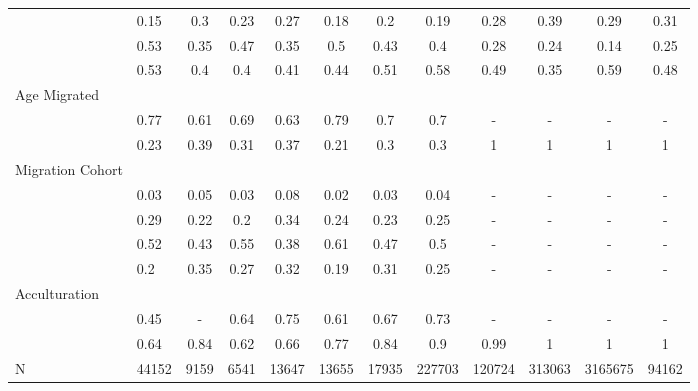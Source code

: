 \begin{table}[ht]
\begin{tabular}{>{\raggedright\arraybackslash}p{3.2cm}|lcccccc|cccc}
  \multicolumn{1}{>{\raggedleft\arraybackslash}p{2.2cm}|}{\makebox[2.2cm][r]{Lives Alone }}& 0.15 & 0.3 & 0.23 & 0.27 & 0.18 & 0.2 & 0.19 & 0.28 & 0.39 & 0.29 & 0.31 \\ 
  \multicolumn{1}{>{\raggedleft\arraybackslash}p{2.9cm}|}{\makebox[2.9cm][r]{Lives with Child }}& 0.53 & 0.35 & 0.47 & 0.35 & 0.5 & 0.43 & 0.4 & 0.28 & 0.24 & 0.14 & 0.25 \\ 
  \multicolumn{1}{>{\raggedleft\arraybackslash}p{3.4cm}|}{\makebox[3.4cm][r]{Married/Cohabiting }}& 0.53 & 0.4 & 0.4 & 0.41 & 0.44 & 0.51 & 0.58 & 0.49 & 0.35 & 0.59 & 0.48 \\ 
  Age Migrated &  &  &  &  &  &  &  &  &  &  &  \\ 
  \multicolumn{1}{>{\raggedleft\arraybackslash}p{1.6cm}|}{\makebox[1.6cm][r]{24 - 49 }}& 0.77 & 0.61 & 0.69 & 0.63 & 0.79 & 0.7 & 0.7 & - & - & - & - \\ 
  \multicolumn{1}{>{\raggedleft\arraybackslash}p{2.6cm}|}{\makebox[2.6cm][r]{50 and Above }}& 0.23 & 0.39 & 0.31 & 0.37 & 0.21 & 0.3 & 0.3 & 1 & 1 & 1 & 1 \\ 
  Migration Cohort &  &  &  &  &  &  &  &  &  &  &  \\ 
  \multicolumn{1}{>{\raggedleft\arraybackslash}p{2.3cm}|}{\makebox[2.3cm][r]{Before 1965 }}& 0.03 & 0.05 & 0.03 & 0.08 & 0.02 & 0.03 & 0.04 & - & - & - & - \\ 
  \multicolumn{1}{>{\raggedleft\arraybackslash}p{2.2cm}|}{\makebox[2.2cm][r]{1965 - 1979 }}& 0.29 & 0.22 & 0.2 & 0.34 & 0.24 & 0.23 & 0.25 & - & - & - & - \\ 
  \multicolumn{1}{>{\raggedleft\arraybackslash}p{2.2cm}|}{\makebox[2.2cm][r]{1980 - 1999 }}& 0.52 & 0.43 & 0.55 & 0.38 & 0.61 & 0.47 & 0.5 & - & - & - & - \\ 
  \multicolumn{1}{>{\raggedleft\arraybackslash}p{2.1cm}|}{\makebox[2.1cm][r]{After 1999 }}& 0.2 & 0.35 & 0.27 & 0.32 & 0.19 & 0.31 & 0.25 & - & - & - & - \\ 
  Acculturation &  &  &  &  &  &  &  &  &  &  &  \\ 
  \multicolumn{1}{>{\raggedleft\arraybackslash}p{1.6cm}|}{\makebox[1.6cm][r]{Citizen }}& 0.45 & - & 0.64 & 0.75 & 0.61 & 0.67 & 0.73 & - & - & - & - \\ 
  \multicolumn{1}{>{\raggedleft\arraybackslash}p{3cm}|}{\makebox[3cm][r]{English Speakers }}& 0.64 & 0.84 & 0.62 & 0.66 & 0.77 & 0.84 & 0.9 & 0.99 & 1 & 1 & 1 \\ 
  N & 44152 & 9159 & 6541 & 13647 & 13655 & 17935 & 227703 & 120724 & 313063 & 3165675 & 94162 \\ 
   \hline
\end{tabular}
\endgroup
\end{table}
